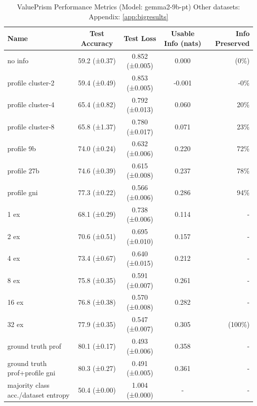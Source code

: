 \documentclass[11pt]{article}
\begin{document}
\begin{table}[h]
\centering
\small
\begin{tabular}{|l|c|c|c|r|}
\hline
Name & Test Accuracy & Test Loss & Usable Info (nats) & Info Preserved \\
\hline
no info & 59.2 (±0.37) & 0.852 (±0.005) & 0.000 & (0\%) \\
profile cluster-2 & 59.4 (±0.49) & 0.853 (±0.005) & -0.001 & -0\% \\
profile cluster-4 & 65.4 (±0.82) & 0.792 (±0.013) & 0.060 & 20\% \\
profile cluster-8 & 65.8 (±1.37) & 0.780 (±0.017) & 0.071 & 23\% \\
profile 9b & 74.0 (±0.24) & 0.632 (±0.006) & 0.220 & 72\% \\
profile 27b & 74.6 (±0.39) & 0.615 (±0.008) & 0.237 & 78\% \\
profile gni & 77.3 (±0.22) & 0.566 (±0.006) & 0.286 & 94\% \\
1 ex & 68.1 (±0.29) & 0.738 (±0.006) & 0.114 & - \\
2 ex & 70.6 (±0.51) & 0.695 (±0.010) & 0.157 & - \\
4 ex & 73.4 (±0.67) & 0.640 (±0.015) & 0.212 & - \\
8 ex & 75.8 (±0.35) & 0.591 (±0.007) & 0.261 & - \\
16 ex & 76.8 (±0.38) & 0.570 (±0.008) & 0.282 & - \\
32 ex & 77.9 (±0.35) & 0.547 (±0.007) & 0.305 & (100\%) \\
ground truth prof & 80.1 (±0.17) & 0.493 (±0.006) & 0.358 & - \\
ground truth prof+profile gni & 80.3 (±0.27) & 0.491 (±0.005) & 0.361 & - \\
majority class acc./dataset entropy & 50.4 (±0.00) & 1.004 (±0.000) & - & - \\
\hline
\end{tabular}
\caption{ValuePrism Performance Metrics (Model: gemma2-9b-pt) Other datasets: Appendix: \ref{app:bigresults}}
\label{tab:performance_valueprism}
\end{table}
\end{document}
